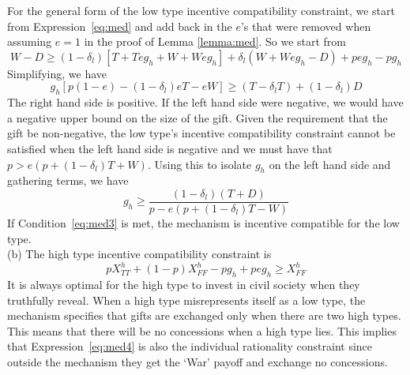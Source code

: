 \documentclass[12pt, letterpaper]{article}
\newcommand{\de}{\delta}
\begin{document}
{For the general form of the low type incentive compatibility constraint, we start from Expression~\ref{eq:med} and add back in the $e$'s that were removed when assuming $e=1$ in the proof of Lemma \ref{lemma:med}. So we start from
\begin{equation*}
			W-D \geq 
			\left(1-\de_l\right) \left[T + Teg_h + W + Weg_h \right] + \de_l \left(W + Weg_h -D \right) + peg_h - pg_h
		\end{equation*}
Simplifying, we have
\[
	g_h\left[p\left(1 - e\right) -(1-\de_l)eT -eW \right] \geq \left(T - \de_l T \right) + \left(1 - \de_l \right) D
\]
The right hand side is positive. If the left hand side were negative, we would have a negative upper bound on the size of the gift. Given the requirement that the gift be non-negative, the low type's incentive compatibility constraint cannot be satisfied when the left hand side is negative and we must have that $p > e\left(p+\left(1-\de_l\right)T + W\right)$. Using this to isolate $g_h$ on the left hand side and gathering terms, we have 
\begin{equation}
	g_h \geq \frac{\left(1 - \de_l \right)\left(T +D \right)}{p - e\left(p +(1-\de_l)T -W \right)} 
	\label{eq:med3}
\end{equation}
If Condition~\ref{eq:med3} is met, the mechanism is incentive compatible for the low type.\\
(b) The high type incentive compatibility constraint is
\begin{equation}
	pX_{TT}^h+(1-p)X_{FF}^h - pg_h +peg_h \geq X_{FF}^h 
	\label{eq:med4}
\end{equation}
It is always optimal for the high type to invest in civil society when they truthfully reveal. When a high type misrepresents itself as a low type, the mechanism specifies that gifts are exchanged only when there are two high types. This means that there will be no concessions when a high type lies. This implies that Expression~\ref{eq:med4} is also the individual rationality constraint since outside the mechanism they get the `War' payoff and exchange no concessions.

}
\end{document}
